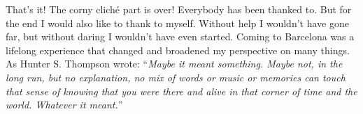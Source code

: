 \begin{acknowledgements}
That's it! The corny cliché part is over! Everybody has been thanked to. But for the end I would also like to thank to myself. Without help I wouldn't have gone far, but without daring I wouldn't have even started. Coming to Barcelona was a lifelong experience that changed and broadened my perspective on many things. As Hunter S. Thompson wrote: “\textit{Maybe it meant something. Maybe not, in the long run, but no explanation, no mix of words or music or memories can touch that sense of knowing that you were there and alive in that corner of time and the world. Whatever it meant.}”

\end{acknowledgements}